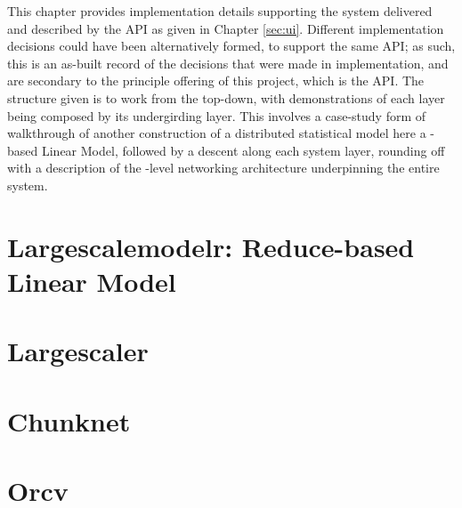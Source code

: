 This chapter provides implementation details supporting the system delivered and described by the API as given in Chapter \ref{sec:ui}.
Different implementation decisions could have been alternatively formed, to support the same API; as such, this is an as-built record of the decisions that were made in implementation, and are secondary to the principle offering of this project, which is the API.
The structure given is to work from the top-down, with demonstrations of each layer being composed by its undergirding layer.
This involves a case-study form of walkthrough of another construction of a distributed statistical model here a -based Linear Model, followed by a descent along each system layer, rounding off with a description of the -level networking architecture underpinning the entire system.

\section{Largescalemodelr: Reduce-based Linear Model}

\section{Largescaler}

\section{Chunknet}

\section{Orcv}

